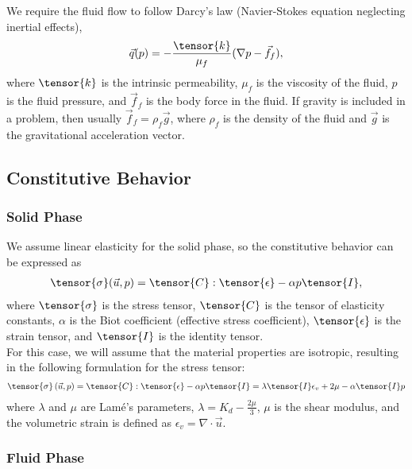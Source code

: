 We require the fluid flow to follow Darcy's law (Navier-Stokes equation neglecting inertial
effects),
\begin{gather}
  \vec{q}(p) = -\frac{\tensor{k}}{\mu_{f}}(\nabla p - \vec{f}_f), \\
\end{gather}
where $\tensor{k}$ is the intrinsic permeability, $\mu_f$ is the viscosity of the
fluid, $p$ is the fluid pressure, and $\vec{f}_f$ is the body force
in the fluid. If gravity is included in a problem, then usually
$\vec{f}_f = \rho_f \vec{g}$, where $\rho_f$ is the density of the
fluid and $\vec{g}$ is the gravitational acceleration vector.\\

\subsection{Constitutive Behavior}

\subsubsection{Solid Phase}

We assume linear elasticity for the solid phase, so the constitutive behavior can be expressed
as
\begin{gather}
  \tensor{\sigma}(\vec{u},p) = \tensor{C} : \tensor{\epsilon} - \alpha p \tensor{I},
\end{gather}
where $\tensor{\sigma}$ is the stress tensor, $\tensor{C}$ is the
tensor of elasticity constants, $\alpha$ is the Biot coefficient
(effective stress coefficient), $\tensor{\epsilon}$ is the strain
tensor, and $\tensor{I}$ is the identity tensor.\\
For this case, we will assume that the material properties are isotropic, resulting
in the following formulation for the stress tensor:
\begin{align}
    \tensor{\sigma}\left(\vec{u},p \right) = \tensor{C}:\tensor{\epsilon} - \alpha p \tensor{I}
                                           = \lambda \tensor{I} \epsilon_{v} + 2 \mu - \alpha \tensor{I} p
\end{align}
where $\lambda$ and $\mu$ are Lam\'e's parameters, $\lambda = K_{d} - \frac{2 \mu}{3}$, $\mu$ is the shear modulus,
and the volumetric strain is defined as  $\epsilon_{v} = \nabla \cdot \vec{u}$.

\subsubsection{Fluid Phase}

